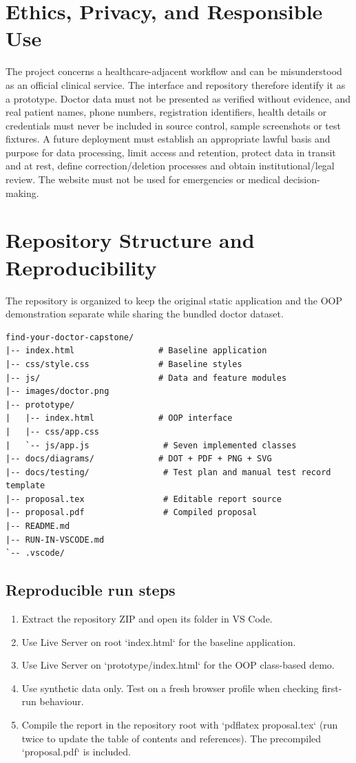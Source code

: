 \documentclass[11pt,a4paper]{article}
\begin{document}
\section{Ethics, Privacy, and Responsible Use}
The project concerns a healthcare-adjacent workflow and can be misunderstood as an official clinical service. The interface and repository therefore identify it as a prototype. Doctor data must not be presented as verified without evidence, and real patient names, phone numbers, registration identifiers, health details or credentials must never be included in source control, sample screenshots or test fixtures. A future deployment must establish an appropriate lawful basis and purpose for data processing, limit access and retention, protect data in transit and at rest, define correction/deletion processes and obtain institutional/legal review. The website must not be used for emergencies or medical decision-making.

\section{Repository Structure and Reproducibility}
The repository is organized to keep the original static application and the OOP demonstration separate while sharing the bundled doctor dataset.
\begin{lstlisting}[basicstyle=\ttfamily\small,breaklines=true,frame=single,rulecolor=\color{lightline},backgroundcolor=\color{pale}]
find-your-doctor-capstone/
|-- index.html                 # Baseline application
|-- css/style.css              # Baseline styles
|-- js/                        # Data and feature modules
|-- images/doctor.png
|-- prototype/
|   |-- index.html             # OOP interface
|   |-- css/app.css
|   `-- js/app.js               # Seven implemented classes
|-- docs/diagrams/             # DOT + PDF + PNG + SVG
|-- docs/testing/               # Test plan and manual test record template
|-- proposal.tex                # Editable report source
|-- proposal.pdf                # Compiled proposal
|-- README.md
|-- RUN-IN-VSCODE.md
`-- .vscode/
\end{lstlisting}

\subsection{Reproducible run steps}
\begin{enumerate}
  \item Extract the repository ZIP and open its folder in VS Code.
  \item Use Live Server on root `index.html` for the baseline application.
  \item Use Live Server on `prototype/index.html` for the OOP class-based demo.
  \item Use synthetic data only. Test on a fresh browser profile when checking first-run behaviour.
  \item Compile the report in the repository root with `pdflatex proposal.tex` (run twice to update the table of contents and references). The precompiled `proposal.pdf` is included.
\end{enumerate}
\end{document}
